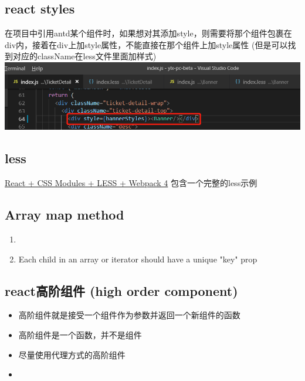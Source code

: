 \documentclass[a4paper, 12pt]{article}
\begin{document}
\subsection{react styles}
在项目中引用antd某个组件时，如果想对其添加style，则需要将那个组件包裹在div内，接着在div上加style属性，不能直接在那个组件上加style属性 (但是可以找到对应的className在less文件里面加样式)\\
\includegraphics{./pics/styleOnComponent.png}


\subsection{less}
\href{https://medium.com/@joseph0crick/react-css-modules-less-webpack-4-a50d902d0a3}{React + CSS Modules + LESS + Webpack 4}
包含一个完整的less示例

\subsection{Array map method}
\begin{enumerate}
\item 

\item Each child in an array or iterator should have a unique "key" prop

\end{enumerate}

\subsection{react高阶组件 (high order component)}
\begin{itemize}
\item 高阶组件就是接受一个组件作为参数并返回一个新组件的函数

\item 高阶组件是一个函数，并不是组件

\item 尽量使用代理方式的高阶组件

\item 

\end{itemize}
\end{document}

